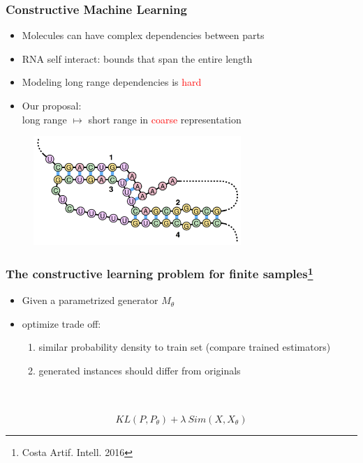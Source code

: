 \documentclass{beamer}
\newcommand{\red}[1]{\textcolor{red}{#1}}
\begin{document}
\begin{frame}
\frametitle{Constructive Machine Learning}

    \begin{itemize}
        \item Molecules can have complex dependencies between parts
        \item RNA self interact: bounds that span the entire length
        \item Modeling long range dependencies is \red{hard}
        \item Our proposal:\\ long range $\mapsto$ short range in \red{coarse} representation
    \end{itemize}
    \begin{figure}[ht]
        \centering
        \includegraphics[width=0.7\textwidth]{images/rna.png}
    \end{figure}    
\end{frame}

\begin{frame}
\frametitle{The constructive learning problem for finite samples\footnote{Costa Artif. Intell. 2016}}
    \begin{itemize}
        \item Given a parametrized generator $M_\theta$ 
        \item optimize trade off:
            \begin{enumerate}
        \item similar probability density to train set (compare trained estimators)
        \item generated instances should  differ from originals
            \end{enumerate}
    \end{itemize}
    ~\\
    ~\\
    $$KL(P,P_\theta) + \lambda  ~ Sim(X, X_\theta)$$
\end{frame}
\end{document}
